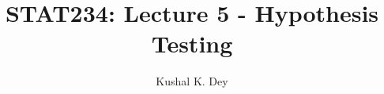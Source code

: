 \documentclass{beamer}\usepackage[]{graphicx}\usepackage[]{color}
\title{STAT234: Lecture 5 - Hypothesis Testing}
\author{Kushal K. Dey}
\date{}
\begin{document}





\begin{frame}{}
\maketitle
\end{frame}

\end{document}
